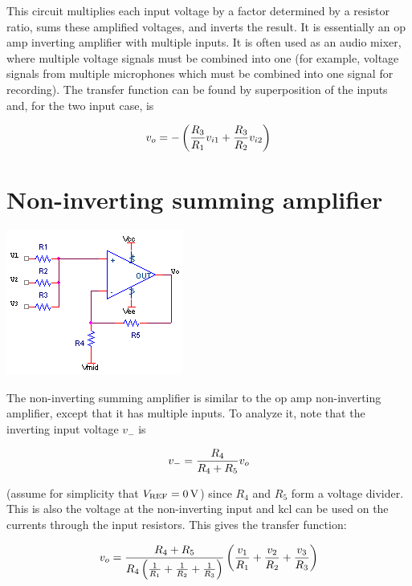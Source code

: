 This circuit multiplies each input voltage by a factor determined by a resistor ratio, sums these amplified voltages, and inverts the result.
It is essentially an op amp inverting amplifier with multiple inputs.
It is often used as an audio mixer, where multiple voltage signals must be combined into one (for example, voltage signals from multiple microphones which must be combined into one signal for recording).
The transfer function can be found by superposition of the inputs and, for the two input case, is

\textcolor{red}{
\begin{equation}
\vout = -\left(\frac{R_3}{R_1}\vin[1] + \frac{R_3}{R_2}\vin[2]\right)
\label{eq:invertingsummingamplifier}
\end{equation}
}


\section{Non-inverting summing amplifier}
\begin{center}
	\includegraphics{schematics/summingamp.PNG}
\end{center}
The non-inverting summing amplifier is similar to the op amp non-inverting amplifier, except that it has multiple inputs. To analyze it, note that the inverting input voltage $v_{-}$ is

\begin{equation}
v_{-} = \frac{R_4}{R_4 + R_5}\vout
\end{equation}

(assume for simplicity that $V\sub{REF} = \SI{0}{\V}$) since $R_4$ and $R_5$ form a voltage divider.
This is also the voltage at the non-inverting input and \ac{kcl} can be used on the currents through the input resistors.
This gives the transfer function:

\textcolor{red}{
\begin{equation}
\vout = \frac{R_4 + R_5}{R_4\left(\frac{1}{R_1} + \frac{1}{R_2} + \frac{1}{R_3}\right)}\left(\frac{v_1}{R_1} + \frac{v_2}{R_2} + \frac{v_3}{R_3}\right)
\label{eq:summingamp}
\end{equation}
}

